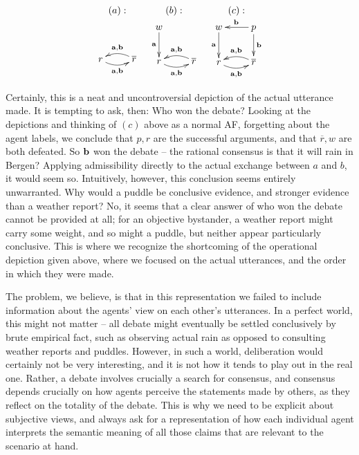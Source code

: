 \documentclass[greybox]{svmult}
\renewcommand{\bar}[1]{\overline{#1}}
\begin{document}
$$
\begin{array}{ccc}
(a): & (b): & (c): \\
\xymatrix{ \\ r\ar@/_/[r]_{{\bf a},{\bf b}} & \bar{r}\ar@/_/[l]_{{\bf a},{\bf b}} } &
\xymatrix{
        w\ar[d]_{{\bf a}} & \\
        r\ar@/_/[r]_{{\bf a},{\bf b}} & \bar{r}\ar@/_/[l]_{{\bf a},{\bf b}} } &
\xymatrix{
        w\ar[d]_{{\bf a}} & p \ar[l]_{{\bf b}} \ar[d]^{{\bf b}} \\
        r\ar@/_/[r]_{{\bf a},{\bf b}} & \bar{r}\ar@/_/[l]_{{\bf a},{\bf b}} }
\end{array}
$$

Certainly, this is a neat and uncontroversial depiction of the actual utterance made. It is tempting to ask, then: Who won the debate? Looking at the depictions and thinking of $(c)$ above as a normal AF, forgetting about the agent labels, we conclude that $p, r$ are the successful arguments, and that $\bar r, w$ are both defeated. So ${\bf b}$ won the debate -- the rational consensus is that it will rain in Bergen? Applying admissibility directly to the actual exchange between $a$ and $b$, it would seem so. Intuitively, however, this conclusion seems entirely unwarranted. Why would a puddle be conclusive evidence, and stronger evidence than a weather report? No, it seems that a clear answer of who won the debate cannot be provided at all; for an objective bystander, a weather report might carry some weight, and so might a puddle, but neither appear  particularly conclusive. This is where we recognize the shortcoming of the operational depiction given above, where we focused on the actual utterances, and the order in which they were made.

The problem, we believe, is that in this representation we failed to include information about the agents' view on each other's utterances. In a perfect world, this might not matter -- all debate might eventually be settled conclusively by brute empirical fact, such as observing actual rain as opposed to consulting weather reports and puddles. However, in such a world, deliberation would certainly not be very interesting, and it is not how it tends to play out in the real one. Rather, a debate involves crucially a search for consensus, and consensus depends crucially on how agents perceive the statements made by others, as they reflect on the totality of the debate. This is why we need to be explicit about subjective views, and always ask for a representation of how each individual agent interprets the semantic meaning of all those claims that are relevant to the scenario at hand.
\end{document}

